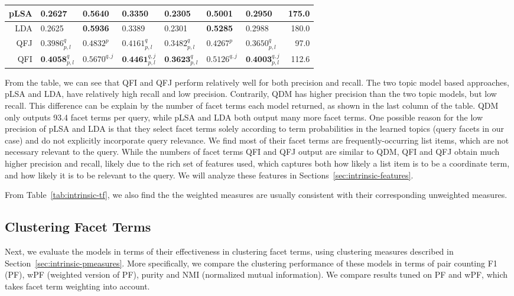 \begin{table}[!ht]
\begin{tabular}{|r|l|l|l|l|l|l|r|}
pLSA & 0.2627 & 0.5640 & 0.3350 & 0.2305 & 0.5001 & 0.2950 & 175.0 \\ \hline
LDA & 0.2625 & \textbf{0.5936} & 0.3389 & 0.2301 & \textbf{0.5285} & 0.2988 & 180.0 \\ \hline
QFJ & $0.3986^{q}_{p,l}$ & $0.4832^{p}$ & $0.4161^{q}_{p,l}$ & $0.3482^{q}_{p,l}$ & $0.4267^{p}$ & $0.3650^{q}_{p,l}$ & 97.0 \\ \hline
QFI & $\textbf{0.4058}^{q}_{p,l}$ & $0.5670^{q,j}$ & $\textbf{0.4461}^{q,j}_{p,l}$ & $\textbf{0.3623}^{q}_{p,l}$ & $0.5126^{q,j}$ & $\textbf{0.4003}^{q,j}_{p,l}$ & 112.6 \\ \hline
\end{tabular}
\end{table}
From the table, we can see that QFI and QFJ perform relatively well for both precision and recall. 
The two topic model based approaches, pLSA and LDA, have relatively high recall and low precision. Contrarily, QDM has higher precision than the two topic models, but low recall.
This difference can be explain by the number of facet terms each model returned, as shown in the last column of the table. QDM only outputs 93.4 facet terms per query, while pLSA and LDA both output many more facet terms. One possible reason for the low precision of pLSA and LDA is that they select facet terms solely according to term probabilities in the learned topics (query facets in our case) and do not explicitly incorporate query relevance. We find most of their facet terms are frequently-occurring list items, which are not necessary relevant to the query.
While the numbers of facet terms QFI and QFJ output are similar to QDM, QFI and QFJ obtain much higher precision and recall, likely due to the rich set of features used, which captures both how likely a list item is to be a coordinate term, and how likely it is to be relevant to the query. We will analyze these features in Sections~\ref{sec:intrinsic-features}. 


From Table~\ref{tab:intrinsic-tf}, we also find the the weighted measures are usually consistent with their corresponding unweighted measures.

\subsection{Clustering Facet Terms}
Next, we evaluate the models in terms of their effectiveness in clustering facet terms, using clustering measures described in Section~\ref{sec:intrinsic-pmeasures}. More specifically, we compare the clustering performance of these models in terms of pair counting F1 (PF), wPF (weighted version of PF), purity and NMI (normalized mutual information). We compare results tuned on PF  and wPF, which takes facet term weighting into account.


